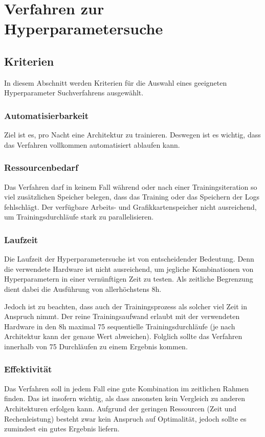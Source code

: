 \section{Verfahren zur Hyperparametersuche}

\subsection{Kriterien}
In diesem Abschnitt werden Kriterien für die Auswahl eines geeigneten Hyperparameter Suchverfahrens ausgewählt.

\subsubsection{Automatisierbarkeit}
Ziel ist es, pro Nacht eine Architektur zu trainieren.
Deswegen ist es wichtig, dass das Verfahren vollkommen automatisiert ablaufen kann.

\subsubsection{Ressourcenbedarf}
Das Verfahren darf in keinem Fall während oder nach einer Trainingsiteration so viel zusätzlichen Speicher belegen, dass das Training oder das Speichern der Logs fehlschlägt.
Der verfügbare Arbeits- und Grafikkartenspeicher nicht ausreichend, um Trainingsdurchläufe stark zu parallelisieren.

\subsubsection{Laufzeit}
Die Laufzeit der Hyperparametersuche ist von entscheidender Bedeutung.
Denn die verwendete Hardware ist nicht ausreichend, um jegliche Kombinationen von Hyperparametern in einer vernünftigen Zeit zu testen.
Als zeitliche Begrenzung dient dabei die Ausführung von allerhöchstens 8h.
\newline

Jedoch ist zu beachten, dass auch der Trainingsprozess als solcher viel Zeit in Anspruch nimmt.
Der reine Trainingsaufwand erlaubt mit der verwendeten Hardware in den 8h maximal 75 sequentielle Trainingsdurchläufe (je nach Architektur kann der genaue Wert abweichen).
Folglich sollte das Verfahren innerhalb von 75 Durchläufen zu einem Ergebnis kommen.

\subsubsection{Effektivität}
Das Verfahren soll in jedem Fall eine gute Kombination im zeitlichen Rahmen finden.
Das ist insofern wichtig, als dass ansonsten kein Vergleich zu anderen Architekturen erfolgen kann.
Aufgrund der geringen Ressourcen (Zeit und Rechenleistung) besteht zwar kein Anspruch auf Optimalität, jedoch sollte es zumindest ein gutes Ergebnis liefern.

